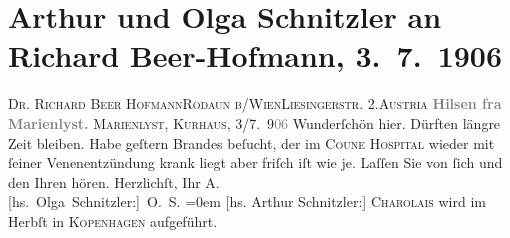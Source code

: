 

         
         \newcommand{\erwaehntePersonen}{Personen: Richard Beer-Hofmann, Georg Brandes}
         \newcommand{\erwaehnteOrte}{Orte: Kommunehospitalet, Kopenhagen, Kurhotellet, Liesingerstraße, Marienlyst, Rodaun, Wien, Österreich}
         \newcommand{\erwaehnteWerke}{Werke: Der Graf von Charolais. Ein Trauerspiel}
               \section[Arthur und Olga Schnitzler an Richard Beer-Hofmann, 3. 7. 1906]{ Arthur und Olga Schnitzler an Richard Beer-Hofmann,
               3. 7. 1906}\nopagebreak{}\rehead{ }\begin{ledgroupsized}[t]{13cm}\normalsize\beginnumbering \toendnotes[C]{\smallbreak\pagebreak[2]} 
\pstart{}{\pb}\textsc{Dr. Richard Beer Hofmann}\pend{}\pstart{}\textsc{Rodaun b/Wien}\pend{}\pstart{}\textsc{Liesingerstr}. 2.\pend{}\pstart{}\textsc{Austria}\pend{}{\bigskip}\pstart
           \noindent{}\centering{}{\pb}\textcolor{gray}{\textbf{Hilsen fra Marienlyst.}}\pend
           \pstart
           \raggedleft{}\textsc{Marienlyst, Kurhaus},
                     3/7. 9\textcolor{gray}{06}\pend
           \pstart
           Wunderſchön hier. Dürften längre Zeit bleiben. Habe geſtern Brandes beſucht, der im \textsc{Co{\geminationm}une Hospital} wieder
               mit ſeiner Venenentzündung krank liegt aber friſch iſt wie je.\pend
           \pstart
           Laſſen Sie von ſich und den Ihren hören. Herzlichſt,\pend
           \pstart
           Ihr \spacefill\mbox{A.}{\\[\baselineskip]}\spacefill\mbox{{[}hs. Olga Schnitzler:{]} O. S.}\pend
           \leftskip=0em{}\pstart
           {[}hs. Arthur Schnitzler:{]} \textsc{Charolais} wird im Herbſt in \textsc{Kopenhagen} aufgeführt.\pend
           

\end{ledgroupsized}

